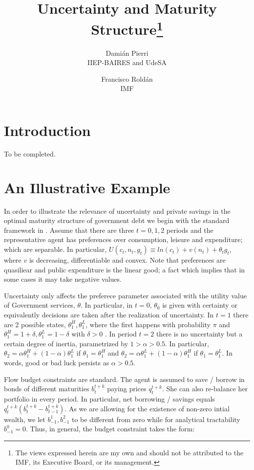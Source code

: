 \documentclass[11pt,letterpaper]{article}
\date{\monthname\xspace \the\year}
\title{Uncertainty and Maturity Structure\thanks{The views expressed herein are my own and should not be attributed to the IMF, its Executive Board, or its management.}}
\author{Damián Pierri \\ IIEP-BAIRES and UdeSA \and Francisco Roldán\\ IMF}
\begin{document}
\maketitle

\begin{abstract}

\end{abstract}

\section{Introduction}
To be completed.

\section{An Illustrative Example}

In order to illustrate the relevance of uncertainty and private savings in the optimal maturity structure of government debt we begin with the standard framework in \citet*{Debortoli}. Assume that there are three $t=0,1,2$ periods and the representative agent has preferences over consumption, leisure and expenditure; which are separable. In particular, $U(c_t,n_t,g_t)\equiv ln(c_t)+v(n_t)+\theta_t g_t$, where $v$ is decreasing, differentiable and convex. Note that preferences are quasiliear and public expenditure is the linear good; a fact which implies that in some cases it may take negative values.

 \bigskip

Uncertainty only affects the preferece parameter associated with the utility value of Government services, $\theta$. In particular, in $t=0$, $\theta_0$ is given with certainty or equivalently decisions are taken after the realization of uncertainty. In $t=1$ there are 2 possible states, $\theta_1^H, \theta_1^L$, where the first happens with probability $\pi$ and $\theta_1^H=1+\delta, \theta_1^L=1-\delta$ with $\delta>0$ . In period $t=2$ there is no uncertainty but a certain degree of inertia, parametrized by $1>\alpha > 0.5$. In particular, $\theta_2=\alpha \theta_1^H+ (1-\alpha) \theta_1^L$ if $\theta_1=\theta_1^H$ and  $\theta_2=\alpha \theta_1^L+ (1-\alpha) \theta_1^H$ if $\theta_1=\theta_1^L$. In words, good or bad luck persists as $\alpha>0.5$.

\bigskip

Flow budget constraints are standard. The agent is assumed to save / borrow in bonds of different maturities $b_t^{t+k}$ paying prices $q_t^{t+k}$. She can also re-balance her portfolio in every period. In particular, net borrowing / savings equals $q_t^{t+k}(b_t^{t+k}-b_{t-1}^{t+k})$. As we are allowing for the existence of non-zero intial wealth, we let $b_{-1}^{1},b_{-1}^{2}$ to be different from zero while for analytical tractability $b_{-1}^{0}=0$.  Thus, in general, the budget constraint takes the form:
\end{document}
